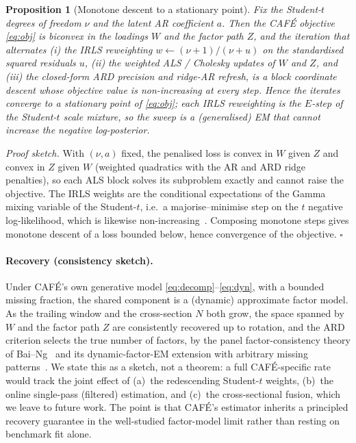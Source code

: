 \documentclass[10pt,twocolumn]{article}
\newcommand{\cafe}{CAF\'E}
\newtheorem{proposition}{Proposition}
\begin{document}
\begin{proposition}[Monotone descent to a stationary point]\label{prop:descent}
Fix the Student-$t$ degrees of freedom $\nu$ and the latent AR coefficient $a$.
Then the \cafe{} objective \eqref{eq:obj} is biconvex in the loadings $W$ and the
factor path $Z$, and the iteration that alternates (i) the IRLS reweighting
$w\!\leftarrow\!(\nu{+}1)/(\nu{+}u)$ on the standardised squared residuals $u$,
(ii) the weighted ALS / Cholesky updates of $W$ and $Z$, and (iii) the closed-form
ARD precision and ridge-AR refresh, is a block coordinate descent whose objective
value is non-increasing at every step. Hence the iterates converge to a stationary
point of \eqref{eq:obj}; each IRLS reweighting is the $E$-step of the Student-$t$
scale mixture, so the sweep is a (generalised) EM that cannot increase the negative
log-posterior.
\end{proposition}
\noindent\emph{Proof sketch.} With $(\nu,a)$ fixed, the penalised loss is convex in
$W$ given $Z$ and convex in $Z$ given $W$ (weighted quadratics with the AR and ARD
ridge penalties), so each ALS block solves its subproblem exactly and cannot raise
the objective. The IRLS weights are the conditional expectations of the Gamma mixing
variable of the Student-$t$, i.e.\ a majorise--minimise step on the $t$ negative
log-likelihood, which is likewise non-increasing~\cite{bishop1999}. Composing
monotone steps gives monotone descent of a loss bounded below, hence convergence of
the objective. $\square$

\paragraph{Recovery (consistency sketch).} Under \cafe{}'s own generative model
\eqref{eq:decomp}--\eqref{eq:dyn}, with a bounded missing fraction, the shared
component is a (dynamic) approximate factor model. As the trailing window and the
cross-section $N$ both grow, the space spanned by $W$ and the factor path $Z$ are
consistently recovered up to rotation, and the ARD criterion selects the true number
of factors, by the panel factor-consistency theory of Bai--Ng~\cite{baing2002} and
its dynamic-factor-EM extension with arbitrary missing patterns~\cite{barigozzi2025dfmem}.
We state this as a sketch, not a theorem: a full \cafe{}-specific rate would track
the joint effect of (a)~the redescending Student-$t$ weights, (b)~the online
single-pass (filtered) estimation, and (c)~the cross-sectional fusion, which we leave
to future work. The point is that \cafe{}'s estimator inherits a principled recovery
guarantee in the well-studied factor-model limit rather than resting on benchmark fit
alone.
\end{document}
